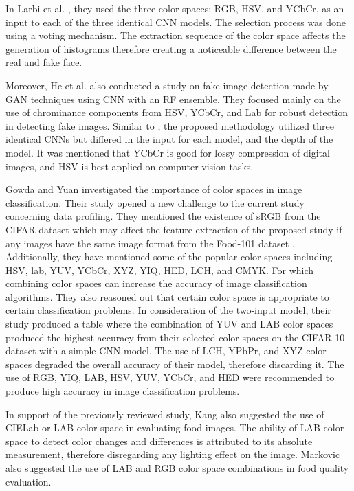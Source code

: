 In Larbi et al. \cite{larbi-2018}, they used the three color spaces; RGB, HSV, and YCbCr, as an input to each of the three identical CNN models. The selection process was done using a voting mechanism. The extraction sequence of the color space affects the generation of histograms therefore creating a noticeable difference between the real and fake face.

Moreover, He et al. \cite{he-2019} also conducted a study on fake image detection made by GAN techniques using CNN with an RF ensemble. They focused mainly on the use of chrominance components from HSV, YCbCr, and Lab for robust detection in detecting fake images. Similar to \cite{larbi-2018}, the proposed methodology utilized three identical CNNs but differed in the input for each model, and the depth of the model. It was mentioned that YCbCr is good for lossy compression of digital images, and HSV is best applied on computer vision tasks.

Gowda and Yuan \cite{gowda-2019} investigated the importance of color spaces in image classification. Their study opened a new challenge to the current study concerning data profiling. They mentioned the existence of sRGB from the CIFAR dataset which may affect the feature extraction of the proposed study if any images have the same image format from the Food-101 dataset \cite{bossard-2014}. Additionally, they have mentioned some of the popular color spaces including HSV, lab, YUV, YCbCr, XYZ, YIQ, HED, LCH, and CMYK. For which combining color spaces can increase the accuracy of image classification algorithms. They also reasoned out that certain color space is appropriate to certain classification problems.  In consideration of the two-input model, their study produced a table where the combination of YUV and LAB color spaces produced the highest accuracy from their selected color spaces on the CIFAR-10 dataset with a simple CNN model. The use of LCH, YPbPr, and XYZ color spaces degraded the overall accuracy of their model, therefore discarding it. The use of RGB, YIQ, LAB, HSV, YUV, YCbCr, and HED were recommended to produce high accuracy in image classification problems.

In support of the previously reviewed study, Kang \cite{kang-2011} also suggested the use of CIELab or LAB color space in evaluating food images. The ability of LAB color space to detect color changes and differences is attributed to its absolute measurement, therefore disregarding any lighting effect on the image. Markovic \cite{markovic2013color} also suggested the use of LAB and RGB color space combinations in food quality evaluation. 

